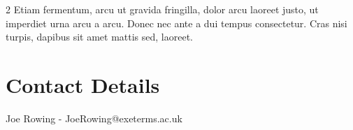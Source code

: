 \documentclass{article}
\begin{document}
\begin{multicols}{2}
Etiam fermentum, arcu ut gravida fringilla, dolor arcu laoreet justo, ut imperdiet urna arcu a arcu. Donec nec ante a dui tempus consectetur. Cras nisi turpis, dapibus sit amet mattis sed, laoreet.

\section*{Contact Details}
Joe Rowing - JoeRowing@exeterms.ac.uk
\end{multicols}
\end{document}
